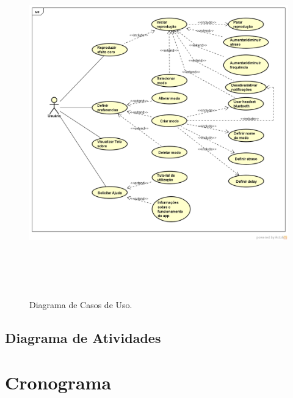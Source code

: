 \begin{figure}[H]
	\centering
	\caption[Diagrama de Casos de Uso]{Diagrama de Casos de Uso. \label{fig:diagramadecasosdeuso}}
	\includegraphics[height=15cm]{./Figuras/usecase_diagram.png}%
\end{figure}



\subsection{Diagrama de Atividades}

\section{Cronograma}


